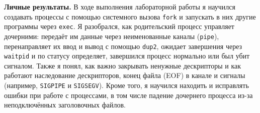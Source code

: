 \documentclass[11pt, a4paper]{article}
\begin{document}
\medskip
\noindent\textbf{Личные результаты.} В ходе выполнения лабораторной работы я
научился создавать процессы с помощью системного вызова \texttt{fork} и
запускать в них другие программы через \texttt{exec}. Я разобрался, как
родительский процесс управляет дочерними: передаёт им данные через
неименованные каналы (\texttt{pipe}), перенаправляет их ввод и вывод
с помощью \texttt{dup2}, ожидает завершения через \texttt{waitpid} и по
статусу определяет, завершился процесс нормально или был убит сигналом.
Также я понял, как важно закрывать ненужные дескрипторы и как работают
наследование дескрипторов, конец файла (EOF) в канале и сигналы
(например, \texttt{SIGPIPE} и \texttt{SIGSEGV}). Кроме того, я
научился находить и исправлять ошибки при работе с процессами, в том числе
падение дочернего процесса из-за неподключённых заголовочных файлов.
\end{document}
